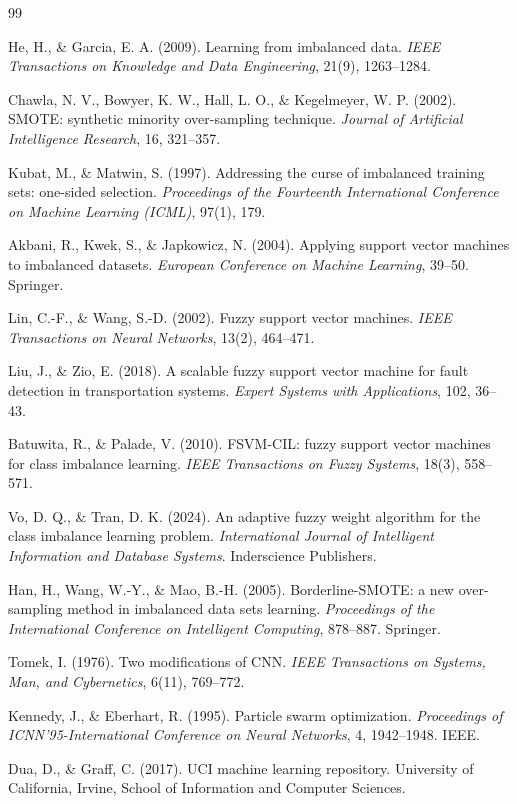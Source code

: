 \documentclass[pdflatex,sn-mathphys-num]{sn-jnl}%
\theoremstyle{thmstyleone}%
\theoremstyle{thmstyletwo}
\theoremstyle{thmstylethree}
\begin{document}
\begin{thebibliography}{99}

He, H., \& Garcia, E. A. (2009). Learning from imbalanced data. \textit{IEEE Transactions on Knowledge and Data Engineering}, 21(9), 1263--1284.

Chawla, N. V., Bowyer, K. W., Hall, L. O., \& Kegelmeyer, W. P. (2002). SMOTE: synthetic minority over-sampling technique. \textit{Journal of Artificial Intelligence Research}, 16, 321--357.

Kubat, M., \& Matwin, S. (1997). Addressing the curse of imbalanced training sets: one-sided selection. \textit{Proceedings of the Fourteenth International Conference on Machine Learning (ICML)}, 97(1), 179.

Akbani, R., Kwek, S., \& Japkowicz, N. (2004). Applying support vector machines to imbalanced datasets. \textit{European Conference on Machine Learning}, 39--50. Springer.

Lin, C.-F., \& Wang, S.-D. (2002). Fuzzy support vector machines. \textit{IEEE Transactions on Neural Networks}, 13(2), 464--471.

Liu, J., \& Zio, E. (2018). A scalable fuzzy support vector machine for fault detection in transportation systems. \textit{Expert Systems with Applications}, 102, 36--43.

Batuwita, R., \& Palade, V. (2010). FSVM-CIL: fuzzy support vector machines for class imbalance learning. \textit{IEEE Transactions on Fuzzy Systems}, 18(3), 558--571.

Vo, D. Q., \& Tran, D. K. (2024). An adaptive fuzzy weight algorithm for the class imbalance learning problem. \textit{International Journal of Intelligent Information and Database Systems}. Inderscience Publishers.

Han, H., Wang, W.-Y., \& Mao, B.-H. (2005). Borderline-SMOTE: a new over-sampling method in imbalanced data sets learning. \textit{Proceedings of the International Conference on Intelligent Computing}, 878--887. Springer.

Tomek, I. (1976). Two modifications of CNN. \textit{IEEE Transactions on Systems, Man, and Cybernetics}, 6(11), 769--772.

Kennedy, J., \& Eberhart, R. (1995). Particle swarm optimization. \textit{Proceedings of ICNN'95-International Conference on Neural Networks}, 4, 1942--1948. IEEE.

Dua, D., \& Graff, C. (2017). UCI machine learning repository. University of California, Irvine, School of Information and Computer Sciences.

\end{thebibliography}


\end{document}
